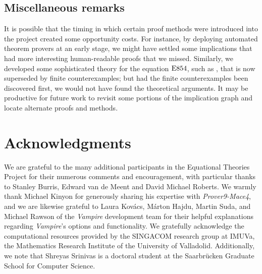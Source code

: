 \subsection{Miscellaneous remarks}\label{misc-sec}

It is possible that the timing in which certain proof methods were introduced into the project created some opportunity costs.  For instance, by deploying automated theorem provers at an early stage, we might have settled some implications that had more interesting human-readable proofs that we missed.  Similarly, we developed some sophisticated theory for the equation $\mathrm{E}854$, such as , that is now superseded by finite counterexamples; but had the finite counterexamples been discovered first, we would not have found the theoretical arguments.  It may be productive for future work to revisit some portions of the implication graph and locate alternate proofs and methods.


\section*{Acknowledgments}

We are grateful to the many additional participants in the Equational Theories Project for their
numerous comments and encouragement, with particular thanks to Stanley Burris, Edward van de Meent and David Michael Roberts. We warmly thank Michael Kinyon for generously sharing his expertise with \emph{Prover9-Mace4}, and we are likewise grateful to Laura Kovács, Márton Hajdu, Martin Suda, and Michael Rawson of the \emph{Vampire} development team for their helpful explanations regarding \emph{Vampire}'s options and functionality. We gratefully acknowledge the computational resources provided by the SINGACOM research group at IMUVa, the Mathematics Research Institute of the University of Valladolid. Additionally, we note that Shreyas Srinivas is a doctoral student at the Saarbr\"{u}cken Graduate School for Computer Science.
